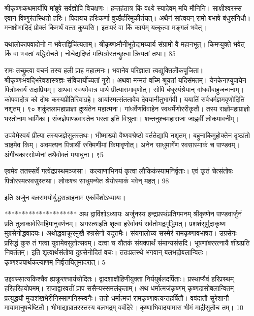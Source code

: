 श्रीकृष्णःकथमार्योपि मांब्रूषे सर्वज्ञोपि विचक्षणः।
हन्तहंतात्र किं वक्ष्ये स्यादेवम् मयि मौनिनि।
साक्षीश्वरस्स एवान विष्णुरंतस्थितो हरिः।
पिदायच हरिःकर्णा वुच्छैर्हरिमुकीर्तयत्।
अथैनं सांत्वयन् रामो बभाषे बंधुसंनिधौ।
मनक्षोभादिदं प्रोक्तं किमर्थं वत्स कुप्यसि।
इतःपरं वा किं कार्यम् यत्कृत्वा मङ्गलं भवेत्।

यथालोकापवादोनो न भवेत्तद्विचिंत्यताम्।
श्रीकृष्णःमौनीभूतेद्यमय्यार्य संग्रामो वै महानभूत्।
किमप्युक्ते भवेत् किं वा भवतां यद्धिरोचते।
नोचेद्यदिष्ठं मत्पित्रोस्तच्छ्रुत्वा क्रियतां तथा।
85


रामः
तच्छ्रुत्वा वचनं तस्य हली प्राह महात्मनः।
भवानेव परिज्ञाता त्वद्युक्तिलॊकपूजिता।
श्रीकृष्णःभवद्भिरेवशास्त्रज्ञः संविचार्योच्यतां गुरो।
अथवा मन्मतं वच्मि श्रूयतां यदिसंमतम्।
येनकेनाप्युपायेन पित्रोःकार्यं सदाप्रियम्।
अथवा स्वयमेवात्र पार्थ प्रीत्यासमावृणोत्।
सोपि बंधुरयंश्रेयान् गांधर्वोबाहुजन्मनाम्।
कोपवादोत्र को दोषः कस्यप्रीतिरिवाग्रहे।
आर्यास्मत्संततावेव देवयानीतुभार्गवी।
ययातिं सर्वधर्मज्ञमवृणोदिति नशृतम्।
९० शकुंतलामहाप्राज्ञा दुष्यंतेन महात्मना।
गांधर्वेणविवाहेन स्वधर्मेणोररीकृतौ।
तस्य राज्ञोमहाप्राज्ञो भरतोनाम धार्मिकः।
संजज्ञेपाण्डवास्तेन भरता इति विश्रुताः।
शन्तनुश्चमहाराजा जाह्नवीं लोकपावनीम्।

उपयेमेस्वयं प्रीत्या तस्यजज्ञेसुतस्तथः।
भीष्माख्यो वैष्णवश्रेष्ठो वर्ततेद्यापि नशृतम्।
बहुनाकिमुहोक्तेन दृष्ठांतो त्राहमेव किम्।
अवमत्यन पित्रार्थी रुक्मिणीमां किमावृणोत्।
अनेन साधुमार्गेण स्वसास्माकं च पाण्डवम्।
अंगीचकारसोप्येनां तथैवोक्तं मयाधुना।
९5

एवमेव ततस्सर्वे गत्वेंद्रप्रस्थमञ्जसा।
कल्याणाभिनयं कृत्वा लौकिकंस्यामनिर्वृताः।
एवं कृतं चेत्संतोषः पित्रोरस्मत्स्वसुस्तथा।
लोकश्च साधुमन्येत श्रेयोस्माकं भवेन् महत्।
98

इति अर्जुन बलरामयोर्युद्धसन्नाहनाम
एकविंशोऽध्यायः।

*********************
अथ द्वाविंशोऽध्यायः अर्जुनस्य इन्द्रप्रस्थंप्रतिगमनम् श्रीकृष्णेन पाण्डवार्जुनं प्रति तुलाकावेरिमहिमानुवर्णनम्।
अगस्त्यःइति शृत्वा हरेर्वाक्यं सर्वतोभद्रमृद्धिमत्।
प्रशशंसुर्मुदाकृष्ण मुग्रसेनोद्धवादयः।
अथोद्धवाक्रूरमुखै रुग्रसेनो यदूत्तमैः।
संयगालोच्य सस्मेरं रामकृष्णावभाषत।
उग्रसेनः
प्रसिद्धं कुरु तं गत्वा युवामेवसुतोत्सवम्।
दत्वा च यौतकं संयक्पार्थं संमान्यसंसदि।
भूषणांबररत्नायै शीघ्रप्रति निवर्ततम्।
इति शृत्वार्थसंतोषा दुग्रसेनोदितं वचः।
ततःप्रतस्थे भगवान् बलभद्रोबलान्वितः।
कृष्णश्चपार्थकल्याणम् निर्वृत्तयितुमादरात्।
5

उद्दवस्सात्यकिश्चैव ह्यक्रूरश्चार्यचोदितः।
द्वादशाक्षौहिणीयुक्ता निर्ययुर्बलदर्पिताः।
प्रस्थाप्यैवं हरिप्रस्थम् हरिहरिहयोपमम्।
राजाद्वारवतीं प्राप ससैन्यस्समलंकृताम्।
अथ धर्मात्मजंकृष्णम् कृष्णदासोबलान्वितम्।
प्रत्युद्धयौ मुदाशंखभेरीनिस्साणनिस्स्वनैः।
ततो धर्मात्मजं रामकृष्णावत्यन्तहर्षितौ।
ववंदातौ सुरेशानौ मायामानुषचेष्टितौ।
भीमाद्याब्रातरस्तस्य बलभद्रम् ववंदिरे।
कृष्णाभिवादयामास भीमं माद्रीसुतौच तम्।
10

